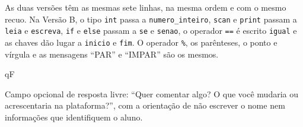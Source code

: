 As duas versões têm as mesmas sete linhas, na mesma ordem e com o mesmo recuo. Na Versão B, o tipo \texttt{int} passa a \texttt{numero\_inteiro}, \texttt{scan} e \texttt{print} passam a \texttt{leia} e \texttt{escreva}, \texttt{if} e \texttt{else} passam a \texttt{se} e \texttt{senao}, o operador \texttt{==} é escrito \texttt{igual} e as chaves dão lugar a \texttt{inicio} e \texttt{fim}. O operador \texttt{\%}, os parênteses, o ponto e vírgula e as mensagens ``PAR'' e ``IMPAR'' são os mesmos.

\begin{questoes}{qF}
    \item\label{qF:comentario} Campo opcional de resposta livre: ``Quer comentar algo? O que você mudaria ou acrescentaria na plataforma?'', com a orientação de não escrever o nome nem informações que identifiquem o aluno.
\end{questoes}
